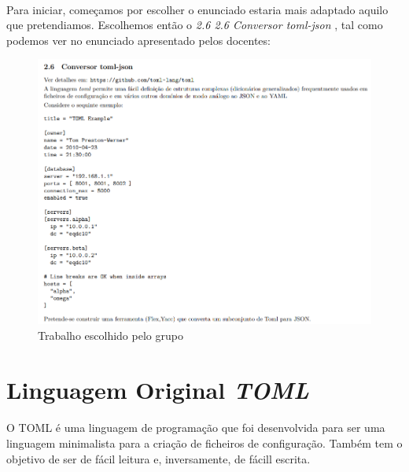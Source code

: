 \documentclass[a4paper]{report}
\begin{document}
\paragraph{} Para iniciar, começamos por escolher  o enunciado estaria mais adaptado aquilo que pretendiamos. Escolhemos então o \textit{2.6 2.6 Conversor toml-json }, tal como podemos ver no enunciado apresentado pelos docentes:
\begin{figure}[H]
    \centering
    \includegraphics[width = \textwidth]{imagens/TrabalhosProposto.png}
    \caption{Trabalho escolhido pelo grupo}
    \label{fig:my_label}
\end{figure}

\newpage

\section{Linguagem Original \textit{TOML}}
\paragraph{} O TOML é uma linguagem de programação que foi desenvolvida para ser uma linguagem minimalista para a criação de ficheiros de configuração. Também tem o objetivo de ser de fácil leitura e, inversamente, de fácill escrita. 
\end{document}
